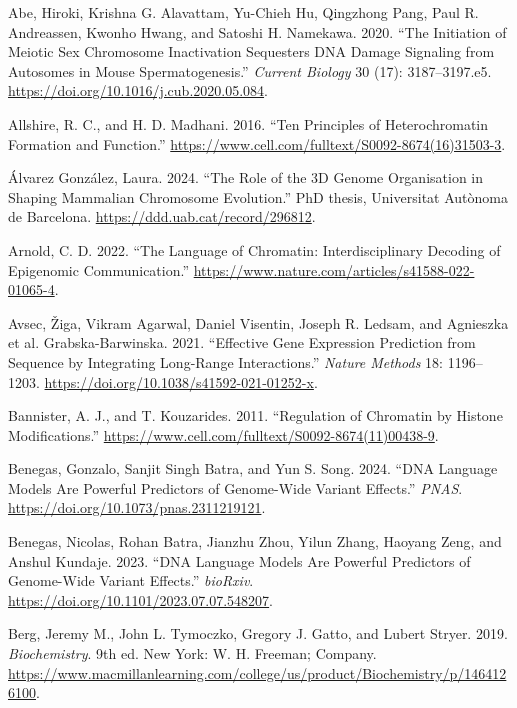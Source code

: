 \documentclass[
  a4paper,
  openany]{scrbook}
\newlength{\cslhangindent}
\newenvironment{CSLReferences}[2] %
 {\begin{list}{}{%
  \setlength{\itemindent}{0pt}
  \setlength{\leftmargin}{0pt}
  \setlength{\parsep}{0pt}
  \ifodd #1
   \setlength{\leftmargin}{\cslhangindent}
   \setlength{\itemindent}{-1\cslhangindent}
  \fi
  \setlength{\itemsep}{#2\baselineskip}}}
 {\end{list}}
\begin{document}
\label{refs}
\begin{CSLReferences}{1}{0}
Abe, Hiroki, Krishna G. Alavattam, Yu-Chieh Hu, Qingzhong Pang, Paul R.
Andreassen, Kwonho Hwang, and Satoshi H. Namekawa. 2020. {``The
Initiation of Meiotic Sex Chromosome Inactivation Sequesters DNA Damage
Signaling from Autosomes in Mouse Spermatogenesis.''} \emph{Current
Biology} 30 (17): 3187--3197.e5.
\url{https://doi.org/10.1016/j.cub.2020.05.084}.

Allshire, R. C., and H. D. Madhani. 2016. {``Ten Principles of
Heterochromatin Formation and Function.''}
\url{https://www.cell.com/fulltext/S0092-8674(16)31503-3}.

Álvarez González, Laura. 2024. {``The Role of the 3D Genome Organisation
in Shaping Mammalian Chromosome Evolution.''} PhD thesis, Universitat
Autònoma de Barcelona. \url{https://ddd.uab.cat/record/296812}.

Arnold, C. D. 2022. {``The Language of Chromatin: Interdisciplinary
Decoding of Epigenomic Communication.''}
\url{https://www.nature.com/articles/s41588-022-01065-4}.

Avsec, Žiga, Vikram Agarwal, Daniel Visentin, Joseph R. Ledsam, and
Agnieszka et al. Grabska-Barwinska. 2021. {``Effective Gene Expression
Prediction from Sequence by Integrating Long-Range Interactions.''}
\emph{Nature Methods} 18: 1196--1203.
\url{https://doi.org/10.1038/s41592-021-01252-x}.

Bannister, A. J., and T. Kouzarides. 2011. {``Regulation of Chromatin by
Histone Modifications.''}
\url{https://www.cell.com/fulltext/S0092-8674(11)00438-9}.

Benegas, Gonzalo, Sanjit Singh Batra, and Yun S. Song. 2024. {``DNA
Language Models Are Powerful Predictors of Genome-Wide Variant
Effects.''} \emph{PNAS}. \url{https://doi.org/10.1073/pnas.2311219121}.

Benegas, Nicolas, Rohan Batra, Jianzhu Zhou, Yilun Zhang, Haoyang Zeng,
and Anshul Kundaje. 2023. {``DNA Language Models Are Powerful Predictors
of Genome-Wide Variant Effects.''} \emph{bioRxiv}.
\url{https://doi.org/10.1101/2023.07.07.548207}.

Berg, Jeremy M., John L. Tymoczko, Gregory J. Gatto, and Lubert Stryer.
2019. \emph{Biochemistry}. 9th ed. New York: W. H. Freeman; Company.
\url{https://www.macmillanlearning.com/college/us/product/Biochemistry/p/1464126100}.


\end{CSLReferences}
\end{document}
